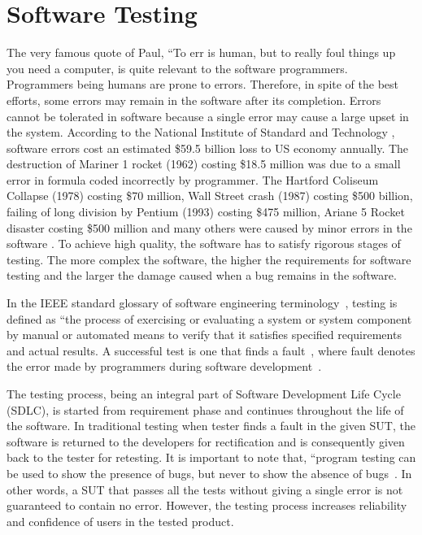\chapter{Software Testing}
\label{chap:softwareTesting}

The very famous quote of Paul, ``To err is human, but to really foul things up you need a computer, is quite relevant to the software programmers. Programmers being humans are prone to errors. Therefore, in spite of the best efforts, some errors may remain in the software after its completion.  Errors cannot be tolerated in software because a single error may cause a large upset in the system. According to the National Institute of Standard and Technology \cite{Tassey2002}, software errors cost an estimated \$59.5 billion loss to US economy annually. The destruction of Mariner 1 rocket (1962) costing \$18.5 million was due to a small error in formula coded incorrectly by programmer. The Hartford Coliseum Collapse (1978) costing \$70 million, Wall Street crash (1987) costing \$500 billion, failing of long division by Pentium (1993) costing \$475 million, Ariane 5 Rocket disaster costing \$500 million and many others were caused by minor errors in the software \cite{toweysoftware}. To achieve high quality, the software has to satisfy rigorous stages of testing. The more complex the software, the higher the requirements for software testing and the larger the damage caused when a bug remains in the software.

\noindent In the IEEE standard glossary of software engineering terminology~\cite{american1984}, testing is defined as ``the process of exercising or evaluating a system or system component by manual or automated means to verify that it satisfies specified requirements and actual results. A successful test is one that finds a fault~\cite{Myers1979}, where fault denotes the error made by programmers during software development~\cite{american1984}.

\noindent The testing process, being an integral part of Software Development Life Cycle (SDLC), is started from requirement phase and continues throughout the life of the software. In traditional testing when tester finds a fault in the given SUT, the software is returned to the developers for rectification and is consequently given back to the tester for retesting. It is important to note that, ``program testing can be used to show the presence of bugs, but never to show the absence of bugs~\cite{Dijkstra1972}. In other words, a SUT that passes all the tests without giving a single error is not guaranteed to contain no error. However, the testing process increases reliability and confidence of users in the tested product. 


